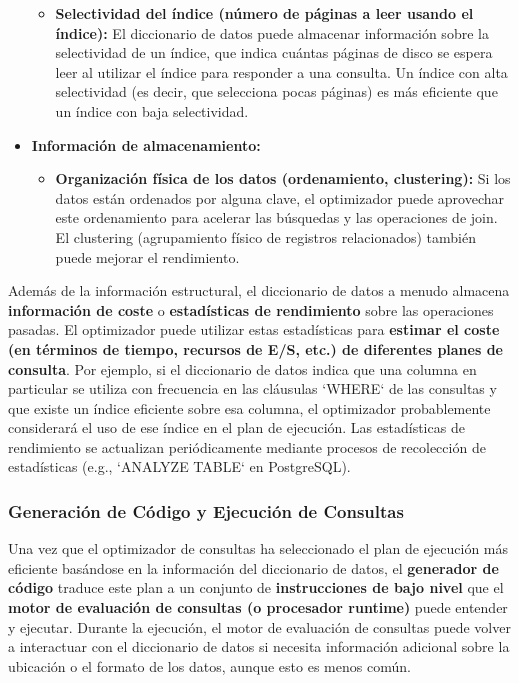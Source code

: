 \begin{itemize}
\begin{itemize}
        \item \textbf{Selectividad del índice (número de páginas a leer usando el índice):}  El diccionario de datos puede almacenar información sobre la selectividad de un índice, que indica cuántas páginas de disco se espera leer al utilizar el índice para responder a una consulta. Un índice con alta selectividad (es decir, que selecciona pocas páginas) es más eficiente que un índice con baja selectividad.
    \end{itemize}
    \item \textbf{Información de almacenamiento:}
    \begin{itemize}
        \item \textbf{Organización física de los datos (ordenamiento, clustering):} Si los datos están ordenados por alguna clave, el optimizador puede aprovechar este ordenamiento para acelerar las búsquedas y las operaciones de join.  El clustering (agrupamiento físico de registros relacionados) también puede mejorar el rendimiento.
    \end{itemize}
\end{itemize}

Además de la información estructural, el diccionario de datos a menudo almacena \textbf{información de coste} o \textbf{estadísticas de rendimiento} sobre las operaciones pasadas. El optimizador puede utilizar estas estadísticas para \textbf{estimar el coste (en términos de tiempo, recursos de E/S, etc.) de diferentes planes de consulta}. Por ejemplo, si el diccionario de datos indica que una columna en particular se utiliza con frecuencia en las cláusulas `WHERE` de las consultas y que existe un índice eficiente sobre esa columna, el optimizador probablemente considerará el uso de ese índice en el plan de ejecución.  Las estadísticas de rendimiento se actualizan periódicamente mediante procesos de recolección de estadísticas (e.g., `ANALYZE TABLE` en PostgreSQL).

\subsubsection{Generación de Código y Ejecución de Consultas}

Una vez que el optimizador de consultas ha seleccionado el plan de ejecución más eficiente basándose en la información del diccionario de datos, el \textbf{generador de código} traduce este plan a un conjunto de \textbf{instrucciones de bajo nivel} que el \textbf{motor de evaluación de consultas (o procesador runtime)} puede entender y ejecutar.  Durante la ejecución, el motor de evaluación de consultas puede volver a interactuar con el diccionario de datos si necesita información adicional sobre la ubicación o el formato de los datos, aunque esto es menos común.

